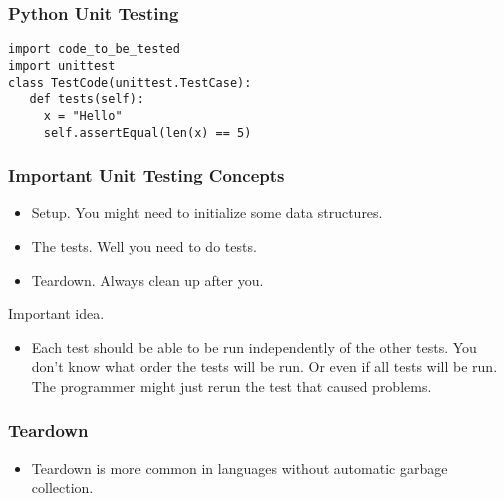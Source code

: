 \documentclass{beamer}
\begin{document}
\begin{frame}[fragile]
  \frametitle{Python Unit Testing}
\begin{lstlisting}
import code_to_be_tested
import unittest
class TestCode(unittest.TestCase):
   def tests(self):
     x = "Hello"
     self.assertEqual(len(x) == 5)
\end{lstlisting}
\end{frame} 
\begin{frame}
  \frametitle{Important Unit Testing Concepts}
  \begin{itemize}
  \item Setup. You might need to initialize some data structures.  \pause
  \item The tests. Well you need to do tests. \pause
  \item Teardown. Always clean up after you. \pause
  \end{itemize}
Important idea.
\begin{itemize}
\item Each test should be able to be run independently of the other
  tests. You don't know what order the tests will be run. Or even if
  all tests will be run. The programmer might just rerun the test that
  caused problems. 
\end{itemize}
\end{frame}
\begin{frame}
  \frametitle{Teardown}
  \begin{itemize}
  \item Teardown is more common in languages without automatic garbage
    collection. 
  \end{itemize}
\end{frame}
\end{document}
